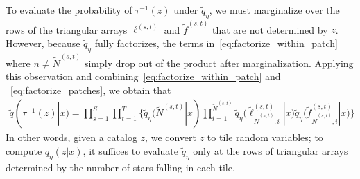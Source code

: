 To evaluate the probability of $\tau^{-1}(z)$ under $\tilde q_\eta$, we must marginalize over the rows of the triangular arrays $\ell^{(s, t)}$ and $\tilde f^{(s, t)}$ that are not determined by $z$. However, 
because $\tilde q_\eta$ fully factorizes, the terms 
in~\eqref{eq:factorize_within_patch} where $n \not= \tilde N^{(s,t)}$ simply drop out of the product
after marginalization.
Applying this observation and combining~\eqref{eq:factorize_within_patch} and ~\eqref{eq:factorize_patches}, we obtain that
\begin{align}
    \tilde q(\tau^{-1}(z) | x) = \prod_{s=1}^S\prod_{t=1}^T
    \Big\{
    \tilde q_\eta(\tilde N^{(s,t)} | x) 
    \prod_{i = 1}^{\tilde N^{(s,t)}}
    \tilde q_\eta\big(\tilde \ell_{\tilde N^{(s,t)},i}^{(s, t)} | x\big)
    \tilde q_\eta\big(\tilde f_{\tilde N^{(s,t)},i}^{(s, t)} | x\big)
    \Big\}
\end{align}
In other words, given a catalog $z$,
we convert $z$ to tile random variables;
to compute $q_\eta(z | x)$, it suffices to evaluate $\tilde q_\eta$ only at the rows of triangular 
arrays determined by the number 
of stars falling in each tile. 



